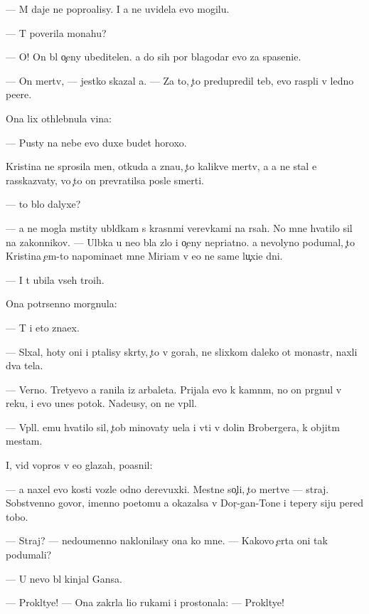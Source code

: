 \documentclass[10pt]{book}
\begin{document}
— M{\yi} daje ne popro{\x}alisy. I {\y}a ne uvidela {\y}evo mogilu.

— T{\yi} poverila monahu?

— O! On b{\yi}l o{\c}eny ubeditelen. {\Y}a do sih por blagodar{\iu} {\y}evo za spaseni{\y}e.

— On mertv, — jestko skazal {\y}a. — Za to, {\c}to predupredil teb{\ia}, {\y}evo rasp{\ia}li v led{\ia}no{\y} pe{\x}ere.

Ona lix othlebnula vina:

— Pusty na nebe {\y}evo duxe budet horoxo.

Kristina ne sprosila men{\ia}, otkuda {\y}a zna{\y}u, {\c}to kalikve{\q} mertv, a {\y}a ne stal {\y}e{\y} rasskaz{\yi}vaty, vo {\c}to on prevratilsa posle smerti.

— {\C}to b{\yi}lo dalyxe?

— {\Y}a ne mogla mstity ubl{\iu}dkam s krasn{\yi}mi verevkami na r{\ia}sah. No mne hvatilo sil na zakonnikov. — Ul{\yi}bka u ne{\y}o b{\yi}la zlo{\y} i o{\c}eny nepri{\y}atno{\y}. {\Y}a nevolyno podumal, {\c}to Kristina {\c}em-to napomina{\y}et mne Miriam v {\y}e{\y}o ne sam{\yi}{\y}e lu{\c}xi{\y}e dni.

— I t{\yi} ubila vseh tro{\y}ih.

Ona potr{\ia}senno morgnula:

— T{\yi} i eto zna{\y}ex.

— Sl{\yi}xal, hoty oni i p{\yi}talisy skr{\yi}ty, {\c}to v gorah, ne slixkom daleko ot monast{\yi}r{\ia}, naxli dva tela.

— Verno. Tretyevo {\y}a ranila iz arbaleta. Prijala {\y}evo k kamn{\ia}m, no on pr{\yi}gnul v reku, i {\y}evo unes potok. Nade{\y}usy, on ne v{\yi}pl{\yi}l.

— V{\yi}pl{\yi}l. {\Y}emu hvatilo sil, {\c}tob{\yi} minovaty u{\x}el{\y}a i v{\yi}{\y}ti v dolin{\yi} Brobergera, k objit{\yi}m mestam.

I, vid{\ia} vopros v {\y}e{\y}o glazah, po{\y}asnil:

— {\Y}a naxel {\y}evo kosti vozle odno{\y} derevuxki. Mestn{\yi}{\y}e so{\c}li, {\c}to mertve{\q} — straj. Sobstvenno govor{\ia}, imenno poetomu {\y}a okazalsa v Dor{\c}-gan-To{\y}ne i tepery siju pered tobo{\y}.

— Straj? — nedoumenno naklonilasy ona ko mne. — Kakovo {\c}erta oni tak podumali?

— U nevo b{\yi}l kinjal Gansa.

— Prokl{\ia}tye! — Ona zakr{\yi}la li{\q}o rukami i prostonala: — Prokl{\ia}tye!
\end{document}
